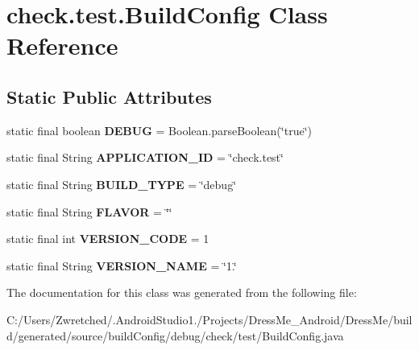 \hypertarget{classcheck_1_1test_1_1_build_config}{}\section{check.\+test.\+Build\+Config Class Reference}
\label{classcheck_1_1test_1_1_build_config}
\subsection*{Static Public Attributes}
\begin{DoxyCompactItemize}
\item 
\hypertarget{classcheck_1_1test_1_1_build_config_aabf1e6f86941588ce636b0419f37723d}{}static final boolean {\bfseries D\+E\+B\+U\+G} = Boolean.\+parse\+Boolean(\char`\"{}true\char`\"{})\label{classcheck_1_1test_1_1_build_config_aabf1e6f86941588ce636b0419f37723d}

\item 
\hypertarget{classcheck_1_1test_1_1_build_config_a0a9ec949967d7b14b61e6c75aaddd864}{}static final String {\bfseries A\+P\+P\+L\+I\+C\+A\+T\+I\+O\+N\+\_\+\+I\+D} = \char`\"{}check.\+test\char`\"{}\label{classcheck_1_1test_1_1_build_config_a0a9ec949967d7b14b61e6c75aaddd864}

\item 
\hypertarget{classcheck_1_1test_1_1_build_config_a87f506b92c1ce5a81f4cf97a64d99640}{}static final String {\bfseries B\+U\+I\+L\+D\+\_\+\+T\+Y\+P\+E} = \char`\"{}debug\char`\"{}\label{classcheck_1_1test_1_1_build_config_a87f506b92c1ce5a81f4cf97a64d99640}

\item 
\hypertarget{classcheck_1_1test_1_1_build_config_aed67290a9095d3b78a9e7c8886f130a0}{}static final String {\bfseries F\+L\+A\+V\+O\+R} = \char`\"{}\char`\"{}\label{classcheck_1_1test_1_1_build_config_aed67290a9095d3b78a9e7c8886f130a0}

\item 
\hypertarget{classcheck_1_1test_1_1_build_config_a43af20e04668190b0fa0f3de4dda8c5e}{}static final int {\bfseries V\+E\+R\+S\+I\+O\+N\+\_\+\+C\+O\+D\+E} = 1\label{classcheck_1_1test_1_1_build_config_a43af20e04668190b0fa0f3de4dda8c5e}

\item 
\hypertarget{classcheck_1_1test_1_1_build_config_ac8bf507b053fa9161a9325f4b4253c09}{}static final String {\bfseries V\+E\+R\+S\+I\+O\+N\+\_\+\+N\+A\+M\+E} = \char`\"{}1.\char`\"{}\label{classcheck_1_1test_1_1_build_config_ac8bf507b053fa9161a9325f4b4253c09}

\end{DoxyCompactItemize}


The documentation for this class was generated from the following file\+:\begin{DoxyCompactItemize}
\item 
C\+:/\+Users/\+Zwretched/.\+Android\+Studio1./\+Projects/\+Dress\+Me\+\_\+\+Android/\+Dress\+Me/build/generated/source/build\+Config/debug/check/test/Build\+Config.\+java\end{DoxyCompactItemize}
